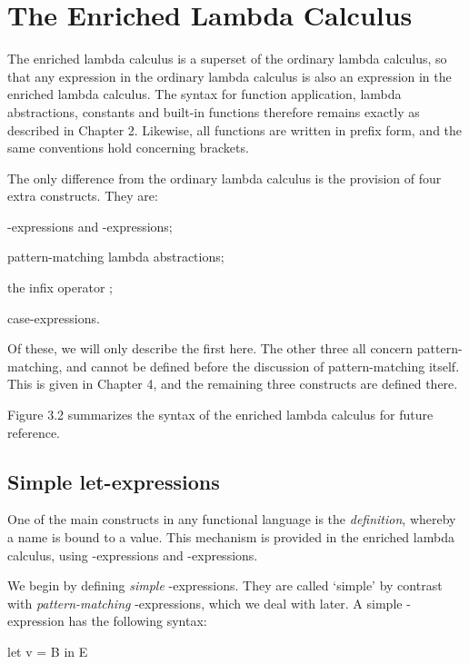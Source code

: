 \section{The Enriched Lambda Calculus}
The enriched lambda calculus is a superset of the ordinary lambda calculus, so that any expression in the ordinary lambda calculus is also an expression in the enriched lambda calculus. The syntax for function application, lambda
abstractions, constants and built-in functions therefore remains exactly as described in Chapter 2. Likewise, all functions are written in prefix form, and the same conventions hold concerning brackets.

The only difference from the ordinary lambda calculus is the provision of four extra constructs. They are:

\begin{numbered}
    \item {}-expressions and -expressions;
    \item pattern-matching lambda abstractions;
    \item the infix operator \fatbar;
    \item case-expressions.
\end{numbered}

Of these, we will only describe the first here. The other three all concern pattern-matching, and cannot be defined before the discussion of pattern-matching itself. This is given in Chapter 4, and the remaining three constructs are defined there.

Figure 3.2 summarizes the syntax of the enriched lambda calculus for future reference.

\subsection{Simple let-expressions}
One of the main constructs in any functional language is the \textit{definition}, whereby a name is bound to a value. This mechanism is provided in the enriched lambda calculus, using -expressions and -expressions.

We begin by defining \textit{simple} -expressions. They are called `simple' by contrast with \textit{pattern-matching} -expressions, which we deal with later. A simple -expression has the following syntax:
\begin{mlcoded}
    let v = B in E
\end{mlcoded}

